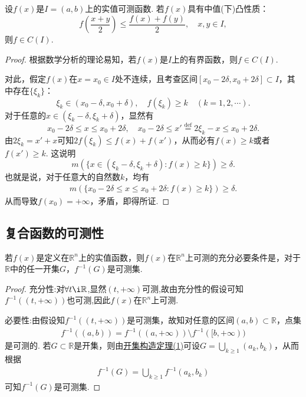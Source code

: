 \documentclass[../../main.tex]{subfiles}
\begin{document}
\begin{example}
设\(f(x)\)是\(I = (a, b)\)上的实值可测函数. 若\(f(x)\)具有中值(下)凸性质：
\[f\left(\frac{x + y}{2}\right) \leqslant \frac{f(x) + f(y)}{2}, \quad x, y \in I,\]
则\(f \in C(I)\).
\end{example}
\begin{proof}
根据数学分析的理论易知，若\(f(x)\)是\(I\)上的有界函数，则\(f \in C(I)\).

对此，假定\(f(x)\)在\(x = x_0 \in I\)处不连续，且考查区间\([x_0 - 2\delta, x_0 + 2\delta] \subset I\)，其中存在\(\{\xi_k\}\)：
\[\xi_k \in (x_0 - \delta, x_0 + \delta), \quad f(\xi_k) \geqslant k \quad (k = 1,2,\cdots).\]
对于任意的\(x \in (\xi_k - \delta, \xi_k + \delta)\)，显然有
\[x_0 - 2\delta \leqslant x \leqslant x_0 + 2\delta, \quad x_0 - 2\delta \leqslant x' \stackrel{\text{def}}{=} 2\xi_k - x \leqslant x_0 + 2\delta.\]
由\(2\xi_k = x' + x\)可知\(2f(\xi_k) \leqslant f(x) + f(x')\)，从而必有\(f(x) \geqslant k\)或者\(f(x') \geqslant k\).
这说明
\[m(\{x \in (\xi_k - \delta, \xi_k + \delta) : f(x) \geqslant k\}) \geqslant \delta.\]
也就是说，对于任意大的自然数\(k\)，均有
\begin{align*}
m(\{x_0 - 2\delta \leqslant x \leqslant x_0 + 2\delta : f(x) \geqslant k\}) \geqslant \delta.
\end{align*}
从而导致\(f(x_0) = +\infty\)，矛盾，即得所证. 

\end{proof}



\subsection{复合函数的可测性}

\begin{lemma}\label{lemma:函数可测的充要条件1}
若\(f(x)\)是定义在\(\mathbb{R}^{n}\)上的实值函数，则\(f(x)\)在\(\mathbb{R}^{n}\)上可测的充分必要条件是，对于\(\mathbb{R}\)中的任一开集\(G\)，\(f^{-1}(G)\)是可测集.
\end{lemma}
\begin{proof}
{\heiti 充分性:}对$\forall t\i \mathbb{R}$,显然$(t,+\infty)$可测,故由充分性的假设可知$f^{-1}((t,+\infty))$也可测,因此$f(x)$在$\mathbb{R}^n$上可测.

{\heiti 必要性:}由假设知\(f^{-1}((t, +\infty))\)是可测集，故知对任意的区间\((a, b) \subset \mathbb{R}\)，点集
\begin{align*}
f^{-1}((a, b)) = f^{-1}((a, +\infty)) \setminus f^{-1}([b, +\infty))
\end{align*}
是可测的. 若\(G \subset \mathbb{R}\)是开集，则由\hyperref[theorem:开集构造定理]{开集构造定理(1)}可设\(G = \bigcup_{k \geqslant 1} (a_k, b_k)\)，从而根据
\begin{align*}
f^{-1}(G) = \bigcup_{k \geqslant 1} f^{-1}(a_k, b_k)
\end{align*}
可知\(f^{-1}(G)\)是可测集.

\end{proof}
\end{document}
